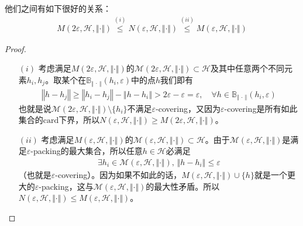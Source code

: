 \documentclass[11pt,a4paper]{ctexart}
\numberwithin{equation}{section}%
\begin{document}
他们之间有如下很好的关系：
\begin{align*}
    M(2\varepsilon , \mathcal{H}, \Vert \cdot \Vert ) \mathop{ \leq  }\limits^{(i)}  N(\varepsilon, \mathcal{H}, \Vert \cdot \Vert ) \mathop{ \leq  }\limits^{(ii)} M(\varepsilon , \mathcal{H}, \Vert \cdot \Vert )
\end{align*}

\begin{proof}
    \begin{itemize}[topsep=2pt,itemsep=0pt]
        \item[$ (i) $] 考虑满足$ M(2\varepsilon, \mathcal{H}, \Vert \cdot \Vert ) $的$ \mathcal{M}(2\varepsilon, \mathcal{H}, \Vert \cdot \Vert ) \subset \mathcal{H} $及其中任意两个不同元素$ h_i,h_j $。取某个在$ \mathbb{B}_{\left\Vert \, \cdot \,  \right\Vert} (h_i, \varepsilon ) $中的点$ h $我们即有
        \begin{align*}
            \left\Vert h-h_j \right\Vert\geq \left\Vert h_i-h_j \right\Vert - \left\Vert h-h_i \right\Vert > 2\varepsilon - \varepsilon = \varepsilon ,\quad \forall h\in \mathbb{B}_{\left\Vert \, \cdot \,  \right\Vert} (h_i, \varepsilon ) 
        \end{align*}
        也就是说$ \mathcal{M}(2\varepsilon, \mathcal{H}, \Vert \cdot \Vert )\setminus \{h_i\} $不满足$ \varepsilon $-covering，又因为$ \varepsilon  $-covering是所有如此集合的$ \mathrm{card} $下界，所以$ N(\varepsilon, \mathcal{H}, \Vert \cdot \Vert ) \geq M(2\varepsilon, \mathcal{H}, \Vert \cdot \Vert ) $。

        \item[$ (ii) $] 考虑满足$ M(\varepsilon, \mathcal{H}, \Vert \cdot \Vert ) $的$ \mathcal{M}(\varepsilon, \mathcal{H}, \Vert \cdot \Vert ) \subset \mathcal{H} $。由于$ \mathcal{M}(\varepsilon, \mathcal{H}, \Vert \cdot \Vert ) $是满足$ \varepsilon  $-packing的最大集合，所以任意$ h\in\mathcal{H} $必满足
        \begin{align*}
            \exists h_i\in \mathcal{M}(\varepsilon, \mathcal{H}, \Vert \cdot \Vert ),\, \left\Vert h-h_i \right\Vert \leq \varepsilon 
        \end{align*}
        （也就是$ \varepsilon  $-covering）。因为如果不如此的话，$ M(\varepsilon, \mathcal{H}, \Vert \cdot \Vert )\cup \{h\} $就是一个更大的$ \varepsilon  $-packing，这与$ \mathcal{M}(\varepsilon, \mathcal{H}, \Vert \cdot \Vert ) $的最大性矛盾。所以$ N(\varepsilon, \mathcal{H}, \Vert \cdot \Vert ) \leq M(\varepsilon, \mathcal{H}, \Vert \cdot \Vert ) $。
        
        
    \end{itemize}
    
        
\end{proof}
\end{document}
